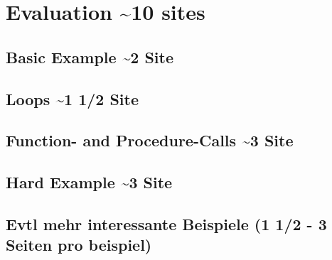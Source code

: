 
\chapter {Evaluation \textasciitilde 10 sites}
\label {cha:evaluation}

\section{Basic Example \textasciitilde 2 Site}
\section{Loops \textasciitilde 1 1/2 Site}
\section{Function- and Procedure-Calls \textasciitilde 3 Site}
\section{Hard Example \textasciitilde 3 Site}
\section{Evtl mehr interessante Beispiele (1 1/2 - 3 Seiten pro beispiel)}
